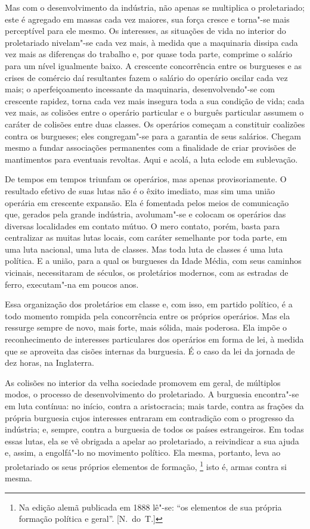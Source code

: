 Mas com o desenvolvimento da indústria, não apenas se multiplica o
proletariado; este é agregado em massas cada vez maiores, sua força
cresce e torna"-se mais perceptível para ele mesmo. Os interesses, as
situações de vida no interior do proletariado nivelam"-se cada vez
mais, à medida que a maquinaria dissipa cada vez mais as diferenças do
trabalho e, por quase toda parte, comprime o salário para um nível
igualmente baixo. A crescente concorrência entre os burgueses e as
crises de comércio daí resultantes fazem o salário do operário oscilar
cada vez mais; o aperfeiçoamento incessante da maquinaria,
desenvolvendo"-se com crescente rapidez, torna cada vez mais insegura
toda a sua condição de vida; cada vez mais, as colisões entre o
operário particular e o burguês particular assumem o caráter de
colisões entre duas classes. Os operários começam a constituir
coalizões contra os burgueses; eles congregam"-se para a garantia de
seus salários. Chegam mesmo a fundar associações permanentes com a
finalidade de criar provisões de mantimentos para eventuais revoltas.
Aqui e acolá, a luta eclode em sublevação.

De tempos em tempos triunfam os operários, mas apenas provisoriamente. O
resultado efetivo de suas lutas não é o êxito imediato, mas sim uma
união operária em crescente expansão. Ela é fomentada pelos meios de
comunicação que, gerados pela grande indústria, avolumam"-se e
colocam os operários das diversas localidades em contato mútuo. O mero
contato, porém, basta para centralizar as muitas lutas locais, com
caráter semelhante por toda parte, em uma luta nacional, uma luta de
classes. Mas toda luta de classes é uma luta política. E a união, para
a qual os burgueses da Idade Média, com seus caminhos vicinais,
necessitaram de séculos, os proletários modernos, com as estradas de
ferro, executam"-na em poucos anos.

Essa organização dos proletários em classe e, com isso, em partido
político, é a todo momento rompida pela concorrência entre os próprios
operários. Mas ela ressurge sempre de novo, mais forte, mais sólida,
mais poderosa. Ela impõe o reconhecimento de interesses particulares
dos operários em forma de lei, à medida que se aproveita das cisões
internas da burguesia. É o caso da lei da jornada de dez horas, na
Inglaterra.

As colisões no interior da velha sociedade promovem em geral, de
múltiplos modos, o processo de desenvolvimento do proletariado. A
burguesia encontra"-se em luta contínua: no início, contra a
aristocracia; mais tarde, contra as frações da própria burguesia cujos
interesses entraram em contradição com o progresso da indústria; e,
sempre, contra a burguesia de todos os países estrangeiros. Em todas
essas lutas, ela se vê obrigada a apelar ao proletariado, a reivindicar
a sua ajuda e, assim, a engolfá"-lo no movimento político. Ela mesma,
portanto, leva ao proletariado os seus próprios elementos de
formação, \footnote{ Na edição alemã publicada em 1888 lê"-se: ``os elementos	
de sua própria formação política e geral''. [N.~do~T.]} isto é, armas contra 
si mesma.

